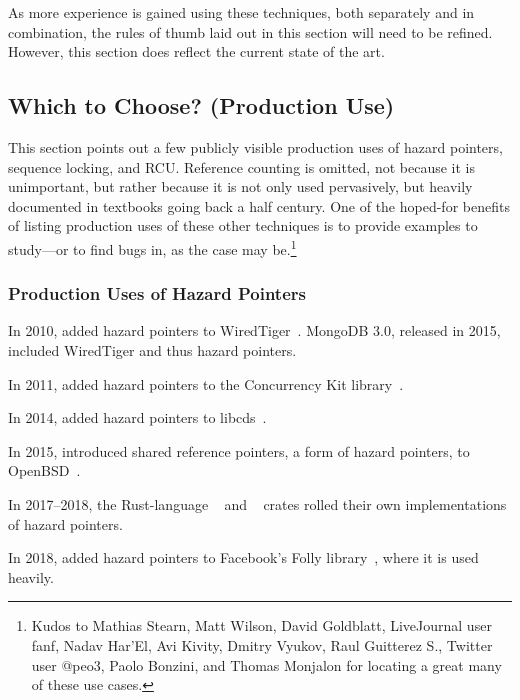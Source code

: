 As more experience is gained using these techniques, both separately
and in combination, the rules of thumb laid out in this section will
need to be refined.
However, this section does reflect the current state of the art.

\subsection{Which to Choose? (Production Use)}
\label{sec:defer:Which to Choose? (Production Use)}

This section points out a few publicly visible production uses of
hazard pointers, sequence locking, and RCU\@.
Reference counting is omitted, not because it is unimportant, but rather
because it is not only used pervasively, but heavily documented in textbooks
going back a half century.
One of the hoped-for benefits of listing production uses of these other
techniques is to provide examples to study---or to find bugs in, as
the case may be.\footnote{
	Kudos to Mathias Stearn, Matt Wilson, David Goldblatt, LiveJournal
	user fanf, Nadav Har'El, Avi Kivity, Dmitry Vyukov, Raul Guitterez
	S., Twitter user @peo3, Paolo Bonzini, and Thomas Monjalon for
	locating a great many of these use cases.}

\subsubsection{Production Uses of Hazard Pointers}
\label{sec:defer:Production Uses of Hazard Pointers}

In 2010,  added hazard pointers to
WiredTiger~\cite{KeithBostic2010WiredTigerhazptr}.
MongoDB 3.0, released in 2015, included WiredTiger and thus hazard pointers.

In 2011,  added hazard pointers to the Concurrency Kit
library~\cite{SamyAlBahra2011ckhp}.

In 2014,  added hazard pointers to
libcds~\cite{MaximKhizhinsky2014libcdsHazptr}.

In 2015,  introduced shared reference pointers, a form
of hazard pointers, to OpenBSD~\cite{DavidGwynne2015srp}.

In 2017--2018, the Rust-language
~\cite{MichalVaner2018arc-swapHazptr} and
~\cite{crates.io.user.ticki2017concHazptr}
crates rolled their own implementations of hazard pointers.

In 2018,  added hazard pointers to Facebook's Folly
library~\cite{MagedMichael2018FollyHazptr}, where it is used heavily.

